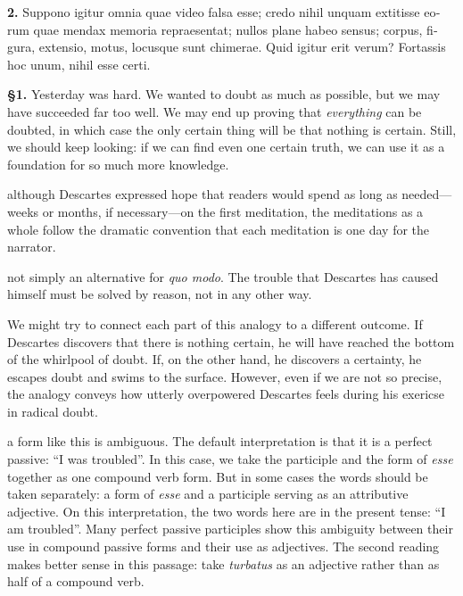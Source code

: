 \beginnumbering
\pstart
\begin{latin}
    \textenglish{\textbf{2.}} Suppono igitur omnia quae video falsa esse; credo nihil unquam extitisse eorum quae mendax memoria repraesentat; nullos plane habeo sensus; corpus, figura, extensio, motus, locusque sunt chimerae. Quid igitur erit verum? Fortassis hoc unum, nihil esse certi.
\end{latin}
\pend
\endnumbering

\prenotes

\textbf{§1.} Yesterday was hard. We wanted to doubt as much as possible, but we may have succeeded far too well. We may end up proving that \textit{everything} can be doubted, in which case the only certain thing will be that nothing is certain. Still, we should keep looking: if we can find even one certain truth, we can use it as a foundation for so much more knowledge.

 although Descartes expressed hope that readers would spend as long as needed---weeks or months, if necessary---on the first meditation, the meditations as a whole follow the dramatic convention that each meditation is one day for the narrator.

 not simply an alternative for \textit{quo modo}. The trouble that Descartes has caused himself must be solved by reason, not in any other way.

 We might try to connect each part of this analogy to a different outcome. If Descartes discovers that there is nothing certain, he will have reached the bottom of the whirlpool of doubt. If, on the other hand, he discovers a certainty, he escapes doubt and swims to the surface. However, even if we are not so precise, the analogy conveys how utterly overpowered Descartes feels during his exericse in radical doubt.

 a form like this is ambiguous. The default interpretation is that it is a perfect passive: ``I was troubled''. In this case, we take the participle and the form of \textit{esse} together as one compound verb form. But in some cases the words should be taken separately: a form of \textit{esse} and a participle serving as an attributive adjective. On this interpretation, the two words here are in the present tense: ``I am troubled''. Many perfect passive participles show this ambiguity between their use in compound passive forms and their use as adjectives. The second reading makes better sense in this passage: take \textit{turbatus} as an adjective rather than as half of a compound verb.

